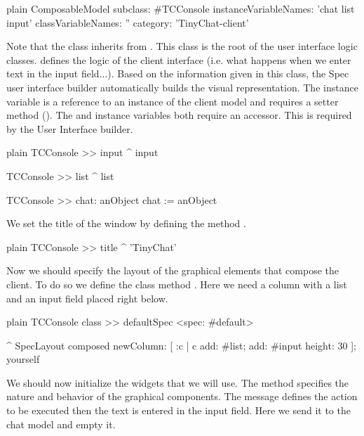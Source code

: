 \documentclass[10pt,twoside,english]{_support/latex/sbabook/sbabook}
\begin{document}
\begin{displaycode}{plain}
ComposableModel subclass: #TCConsole
	instanceVariableNames: 'chat list input'
	classVariableNames: ''
	category: 'TinyChat-client'
\end{displaycode}

Note that the class  inherits from . This class is the root of the user interface logic classes.
  defines the logic of the client interface (i.e. what happens when we enter text in the input field...). Based on the information given in this class, the Spec user interface builder automatically builds the visual representation. 
The  instance variable is a reference to an instance of the client model  and requires a setter method (). The  and  instance variables both require an accessor. This is required by the User Interface builder.

\begin{displaycode}{plain}
TCConsole >> input
	^ input

TCConsole >> list
	^ list

TCConsole >> chat: anObject
	chat := anObject
\end{displaycode}

We set the title of the window by defining the method .

\begin{displaycode}{plain}
TCConsole >> title
	^ 'TinyChat'
\end{displaycode}

Now we should specify the layout of the graphical elements that compose the client.
To do so we define the class method . Here we need a column with a list and an input field placed right below. 

\begin{displaycode}{plain}
TCConsole class >> defaultSpec
	<spec: #default>

	^ SpecLayout composed
		newColumn: [ :c | 
			c add: #list; add: #input height: 30 ]; yourself
\end{displaycode}

We should now initialize the widgets that we will use.
The method  specifies the nature and behavior of the graphical components. 
The message  defines the action to be executed then the text is entered in the input field.
Here we send it to the chat model and empty it.
\end{document}
